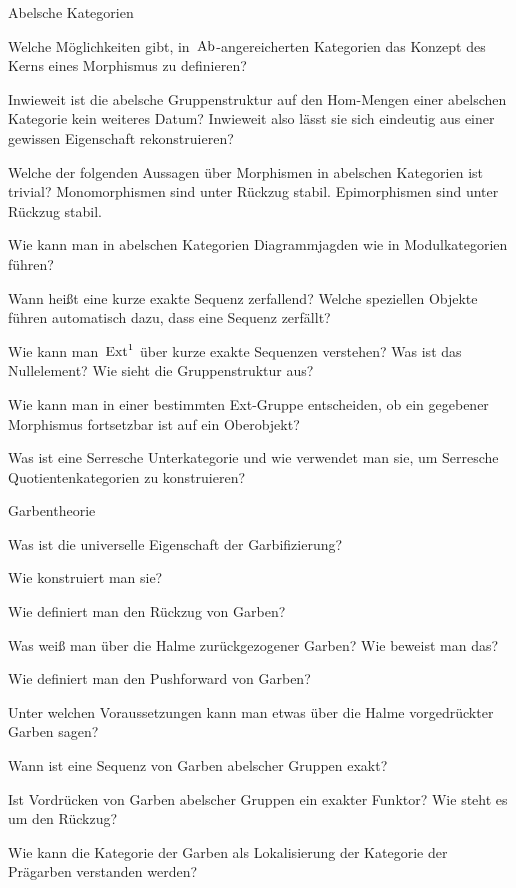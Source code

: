 \documentclass{uebblatt}
\begin{document}
\begin{aufgabeE}{Abelsche Kategorien}
\item Welche Möglichkeiten gibt, in~$\mathrm{Ab}$-angereicherten Kategorien das Konzept
des Kerns eines Morphismus zu definieren?
\item Inwieweit ist die abelsche Gruppenstruktur auf den Hom-Mengen einer
abelschen Kategorie kein weiteres Datum? Inwieweit also lässt sie sich
eindeutig aus einer gewissen Eigenschaft rekonstruieren?
\item Welche der folgenden Aussagen über Morphismen in abelschen Kategorien ist
trivial? Monomorphismen sind unter Rückzug stabil. Epimorphismen sind unter
Rückzug stabil.
\item Wie kann man in abelschen Kategorien Diagrammjagden wie in
Modulkategorien führen?
\item Wann heißt eine kurze exakte Sequenz zerfallend? Welche speziellen
Objekte führen automatisch dazu, dass eine Sequenz zerfällt?
\item Wie kann man~$\mathrm{Ext}^1$ über kurze exakte Sequenzen verstehen? Was ist das
Nullelement? Wie sieht die Gruppenstruktur aus?
\item Wie kann man in einer bestimmten Ext-Gruppe entscheiden, ob ein gegebener
Morphismus fortsetzbar ist auf ein Oberobjekt?
\item Was ist eine Serresche Unterkategorie und wie verwendet man sie, um
Serresche Quotientenkategorien zu konstruieren?
\end{aufgabeE}

\begin{aufgabeE}{Garbentheorie}
\item Was ist die universelle Eigenschaft der Garbifizierung?
\item Wie konstruiert man sie?
\item Wie definiert man den Rückzug von Garben?
\item Was weiß man über die Halme zurückgezogener Garben? Wie beweist man das?
\item Wie definiert man den Pushforward von Garben?
\item Unter welchen Voraussetzungen kann man etwas über die Halme vorgedrückter
Garben sagen?
\item Wann ist eine Sequenz von Garben abelscher Gruppen exakt?
\item Ist Vordrücken von Garben abelscher Gruppen ein exakter Funktor? Wie
steht es um den Rückzug?
\item Wie kann die Kategorie der Garben als Lokalisierung der Kategorie der
Prägarben verstanden werden?
\end{aufgabeE}
\end{document}
